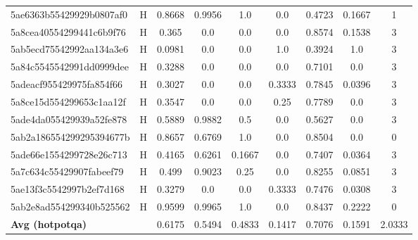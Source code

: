 \begin{table}[h]
\begin{tabular}{llccccccc}
5ae6363b55429929b0807af0 & H & 0.8668 & 0.9956 & 1.0 & 0.0 & 0.4723 & 0.1667 & 1 \\
5a8cea40554299441c6b9f76 & H & 0.365 & 0.0 & 0.0 & 0.0 & 0.8574 & 0.1538 & 3 \\
5ab5ecd75542992aa134a3e6 & H & 0.0981 & 0.0 & 0.0 & 1.0 & 0.3924 & 1.0 & 3 \\
5a84c5545542991dd0999dee & H & 0.3288 & 0.0 & 0.0 & 0.0 & 0.7101 & 0.0 & 3 \\
5adeacf955429975fa854f66 & H & 0.3027 & 0.0 & 0.0 & 0.3333 & 0.7845 & 0.0396 & 3 \\
5a8ce15d554299653c1aa12f & H & 0.3547 & 0.0 & 0.0 & 0.25 & 0.7789 & 0.0 & 3 \\
5ade4da055429939a52fe878 & H & 0.5889 & 0.9882 & 0.5 & 0.0 & 0.5627 & 0.0 & 3 \\
5ab2a186554299295394677b & H & 0.8657 & 0.6769 & 1.0 & 0.0 & 0.8504 & 0.0 & 0 \\
5ade66e1554299728e26c713 & H & 0.4165 & 0.6261 & 0.1667 & 0.0 & 0.7407 & 0.0364 & 3 \\
5a7c634c55429907fabeef79 & H & 0.499 & 0.9023 & 0.25 & 0.0 & 0.8255 & 0.0851 & 3 \\
5ae13f3c5542997b2ef7d168 & H & 0.3279 & 0.0 & 0.0 & 0.3333 & 0.7476 & 0.0308 & 3 \\
5ab2e8ad554299340b525562 & H & 0.9599 & 0.9965 & 1.0 & 0.0 & 0.8437 & 0.2222 & 0 \\
\hline
\textbf{Avg (hotpotqa)} & & 0.6175 & 0.5494 & 0.4833 & 0.1417 & 0.7076 & 0.1591 & 2.0333 \\
\hline
\end{tabular}
\end{table}